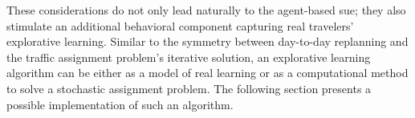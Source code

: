 These considerations do not only lead naturally to the agent-based \gls{sue};
they also stimulate an additional behavioral component capturing
real travelers' explorative learning. Similar to the symmetry
between day-to-day replanning and the traffic assignment problem's iterative solution, 
an explorative learning algorithm can be  either as
a model of real learning or as a computational method to solve a stochastic
assignment problem. The following section presents a possible implementation
of such an algorithm. 



